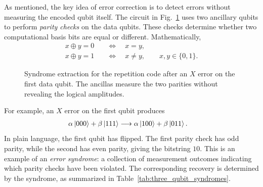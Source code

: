 \documentclass[amssymb,twocolumn,aps]{revtex4-2}
\begin{document}
As mentioned, the key idea of error correction is to detect errors without measuring the encoded qubit itself. The circuit in Fig.~\ref{fig:3_qubit_flip_code} uses two ancillary qubits to perform \textit{parity checks} on the data qubits. These checks determine whether two computational basis bits are equal or different. Mathematically,
\begin{align*}
    x\oplus y=0 &\quad\Longleftrightarrow\quad x=y,\\
    x\oplus y=1 &\quad\Longleftrightarrow\quad x\neq y,
    \qquad x,y\in\{0,1\}.
\end{align*}

\begin{figure}[t]
\centering
{}
\caption{Syndrome extraction for the repetition code after an $X$ error on the first data qubit. The ancillas measure the two parities without revealing the logical amplitudes.}
\label{fig:3_qubit_flip_code}
\end{figure}

For example, an $X$ error on the first qubit produces
\begin{align*}
    \alpha\ket{000}+\beta\ket{111}
    &\longrightarrow
    \alpha\ket{100}+\beta\ket{011}.
\end{align*}
In plain language, the first qubit has flipped. The first parity check has odd parity, while the second has even parity, giving the bitstring $10$. This is an example of an \textit{error syndrome}: a collection of measurement outcomes indicating which parity checks have been violated. The corresponding recovery is determined by the syndrome, as summarized in Table~\ref{tab:three_qubit_syndromes}.
\end{document}

